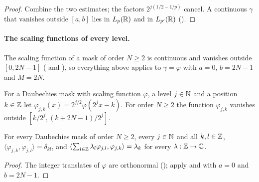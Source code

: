 \begin{proof}
\leanok
{}
Combine the two estimates; the factors $2^{j(1/2 - 1/p)}$ cancel. A continuous $\gamma$ that
vanishes outside $[a, b]$ lies in $L_p(\mathbb{R})$ and in $L_{p'}(\mathbb{R})$
().
\end{proof}

\paragraph{The scaling functions of every level.}
The scaling function of a mask of order $N \geq 2$ is continuous and vanishes outside
$[0, 2N - 1]$ ( and ), so
everything above applies to $\gamma = \varphi$ with $a = 0$, $b = 2N - 1$ and $M = 2N$.

\begin{definition}
\label{def:daub-scaled}
\leanok
{}
For a Daubechies mask with scaling function $\varphi$, a level $j \in \mathbb{N}$ and a position
$k \in \mathbb{Z}$ let $\varphi_{j,k}(x) = 2^{j/2} \varphi(2^j x - k)$. For order $N \geq 2$ the function
$\varphi_{j,k}$ vanishes outside $[k/2^j, (k + 2N - 1)/2^j]$.
\end{definition}

\begin{proposition}
\label{prop:daub-scaled-orthonormal}
\leanok
{}
For every Daubechies mask of order $N \geq 2$, every $j \in \mathbb{N}$ and all $k, l \in \mathbb{Z}$,
$\langle \varphi_{j,k}, \varphi_{j,l} \rangle = \delta_{kl}$, and
$\langle \sum_{l \in \mathbb{Z}} \lambda_l \varphi_{j,l}, \varphi_{j,k} \rangle = \lambda_k$ for every
$\lambda : \mathbb{Z} \to \mathbb{C}$.
\end{proposition}

\begin{proof}
\leanok
{}
The integer translates of $\varphi$ are orthonormal (); apply
 and  with $a = 0$ and
$b = 2N - 1$.
\end{proof}

